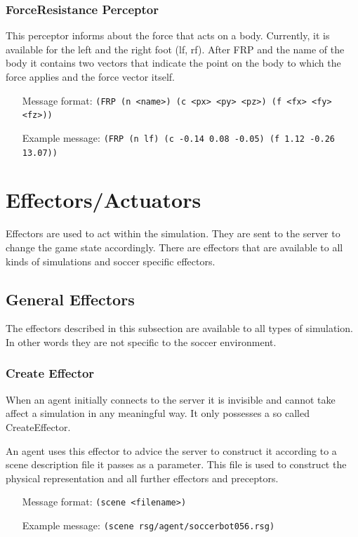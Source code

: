 \subsubsection{ForceResistance Perceptor}
This perceptor informs about the force that acts on a body. Currently, it is
available for the left and the right foot (lf, rf).
After FRP and the name of the body it contains two vectors that indicate the
point on the body to which the force applies and the force vector itself.
\begin{itemize}
	\item[Message format:] \texttt{(FRP (n <name>) (c <px> <py> <pz>) (f <fx> <fy>
	<fz>))}
	\item[Example message:] \texttt{(FRP (n lf) (c -0.14 0.08 -0.05) (f 1.12 -0.26
	13.07))}
\end{itemize}

\section{Effectors/Actuators}
Effectors are used to act within the simulation. They are sent to the server
to change the game state accordingly. There are effectors that are available to
all kinds of simulations and soccer specific effectors.

\subsection{General Effectors}
The effectors described in this subsection are available to all types of
simulation. In other words they are not specific to the soccer environment.

\subsubsection{Create Effector}

When an agent initially connects to the server it is invisible and
cannot take affect a simulation in any meaningful way. It only
possesses a so called CreateEffector.

An agent uses this effector to advice the server to construct it
according to a scene description file it passes as a parameter. This
file is used to construct the physical representation and all further
effectors and preceptors.
\begin{itemize}
	\item[Message format:] \texttt{(scene  <filename>)}
	\item[Example message:] \texttt{(scene rsg/agent/soccerbot056.rsg)}
\end{itemize}

